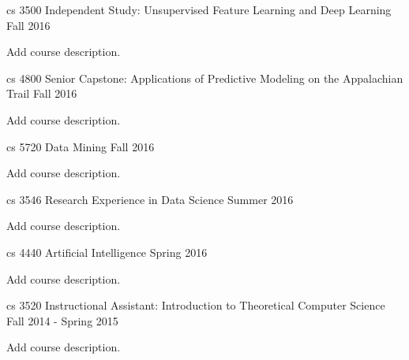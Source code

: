 \begin{cventries}
    \cventry
    {cs 3500}
    {Independent Study: Unsupervised Feature Learning and Deep Learning}
    {Fall 2016}
    {}
    {
        \begin{cvitems}
            \item {Add course description.}
        \end{cvitems}
    } 
    \cventry
    {cs 4800}
    {Senior Capstone: Applications of Predictive Modeling on the Appalachian Trail}
    {Fall 2016}
    {}
    {
        \begin{cvitems}
            \item {Add course description.}
        \end{cvitems}
    }
    \cventry
    {cs 5720}
    {Data Mining}
    {Fall 2016}
    {}
    {
        \begin{cvitems}
            \item {Add course description.}
        \end{cvitems}
    }
    \cventry
    {cs 3546}
    {Research Experience in Data Science}
    {Summer 2016}
    {}
    {
        \begin{cvitems}
            \item {Add course description.}
        \end{cvitems}
    }
    \cventry
    {cs 4440}
    {Artificial Intelligence}
    {Spring 2016}
    {}
    {
        \begin{cvitems}
            \item {Add course description.}
        \end{cvitems}
    }
    \cventry
    {cs 3520}
    {Instructional Assistant: Introduction to Theoretical Computer Science}
    {Fall 2014 - Spring 2015}
    {}
    {
        \begin{cvitems}
            \item {Add course description.}
        \end{cvitems}
    }
\end{cventries}